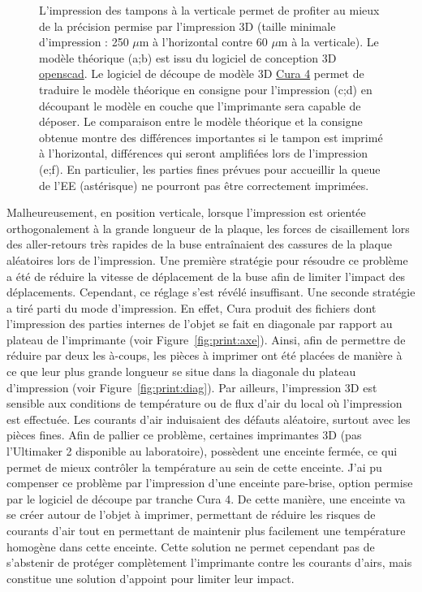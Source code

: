 \documentclass[\main/main.tex]{subfiles}
\begin{document}
\begin{figure}[h!]
    \caption{
        \label{fig:coupe}
        L'impression des tampons à la verticale permet de profiter au mieux de la précision permise par l'impression 3D (taille minimale d'impression : 250 $\mu$m à l'horizontal contre 60 $\mu$m à la verticale).
        \newline
        Le modèle théorique (a;b) est issu du logiciel de conception 3D \href{https://www.openscad.org/}{openscad}.
        Le logiciel de découpe de modèle 3D \href{https://ultimaker.com/fr/software/ultimaker-cura}{Cura 4} permet de traduire le modèle théorique en consigne pour l'impression (c;d) en découpant le modèle en couche que l'imprimante sera capable de déposer.
        Le comparaison entre le modèle théorique et la consigne obtenue montre des différences importantes si le tampon est imprimé à l'horizontal, différences qui seront amplifiées lors de l'impression (e;f).
        En particulier, les parties fines prévues pour accueillir la queue de l'EE (astérisque) ne pourront pas être correctement imprimées.
    }
    
\end{figure}

%
Malheureusement, en position verticale, lorsque l'impression est orientée orthogonalement à la grande longueur de la plaque, les forces de cisaillement lors des aller-retours très rapides de la buse entraînaient des cassures de la plaque aléatoires lors de l'impression.
%
Une première stratégie pour résoudre ce problème a été de réduire la vitesse de déplacement de la buse afin de limiter l'impact des déplacements. Cependant, ce réglage s'est révélé insuffisant.
%
Une seconde stratégie a tiré parti du mode d'impression. En effet, Cura produit des fichiers dont l'impression des parties internes de l'objet se fait en diagonale par rapport au plateau de l'imprimante (voir Figure~\ref{fig:print:axe}).
Ainsi, afin de permettre de réduire par deux les à-coups, les pièces à imprimer ont été placées de manière à ce que leur plus grande longueur se situe dans la diagonale du plateau d'impression (voir Figure~\ref{fig:print:diag}).
%
Par ailleurs, l'impression 3D est sensible aux conditions de température ou de flux d'air du local où l'impression est effectuée. Les courants d'air induisaient des défauts aléatoire, surtout avec les pièces fines. Afin de pallier ce problème, certaines imprimantes 3D (pas l'Ultimaker 2 disponible au laboratoire), possèdent une enceinte fermée, ce qui permet de mieux contrôler la température au sein de cette enceinte. 
J'ai pu compenser ce problème par l'impression d'une enceinte pare-brise, option permise par le logiciel de découpe par tranche Cura 4.
%
De cette manière, une enceinte va se créer autour de l'objet à imprimer, permettant de réduire les risques de courants d'air tout en permettant de maintenir plus facilement une température homogène dans cette enceinte. Cette solution ne permet cependant pas de s'abstenir de protéger complètement l'imprimante contre les courants d'airs, mais constitue une solution d'appoint pour limiter leur impact.
\end{document}
